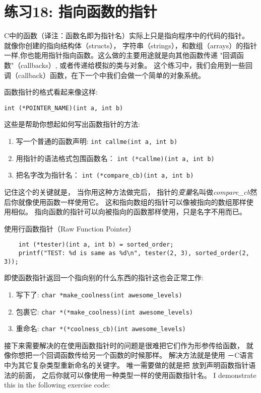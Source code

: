 \chapter{练习18: 指向函数的指针}

C中的函数（译注：函数名即为指针名）实际上只是指向程序中的代码的指针。 就像你创建的指向结构体（structs）， 字符串（strings），和数组（arrays）的指针一样,你也能用指针指向函数。这么做的主要用途就是向其他函数传递
"回调函数"（callbacks）, 或者传递给模拟的类与对象。 这个练习中，我们会用到一些回调（callback）函数，在下一个中我们会做一个简单的对象系统。

函数指针的格式看起来像这样:

\verb|int (*POINTER_NAME)(int a, int b)|

这些是帮助你想起如何写出函数指针的方法:

\begin{enumerate}
\item 写一个普通的函数声明: \verb|int callme(int a, int b)|
\item 用指针的语法格式包围函数名： \verb|int (*callme)(int a, int b)|
\item 把名字改为指针名： \verb|int (*compare_cb)(int a, int b)|
\end{enumerate}

记住这个的关键就是， 当你用这种方法做完后， 指针的\emph{变量}名叫做\emph{compare\_cb}然后你就像使用函数一样使用它。  这和指向数组的指针可以像被指向的数组那样使用相似。 指向函数的指针可以向被指向的函数那样使用，只是名字不用而已。

\begin{code}{使用行函数指针（Raw Function Pointer）}
\begin{lstlisting}
    int (*tester)(int a, int b) = sorted_order;
    printf("TEST: %d is same as %d\n", tester(2, 3), sorted_order(2, 3)); 
\end{lstlisting}
\end{code}

即使函数指针返回一个指向别的什么东西的指针这也会正常工作:

\begin{enumerate}
\item 写下了: \verb|char *make_coolness(int awesome_levels)|
\item 包裹它: \verb|char *(*make_coolness)(int awesome_levels)|
\item 重命名: \verb|char *(*coolness_cb)(int awesome_levels)|
\end{enumerate}

接下来需要解决的在使用函数指针时的问题是很难把它们作为形参传给函数， 就像你想把一个回调函数传给另一个函数的时候那样。 解决方法就是使用 －C语言中为其它复杂类型重新命名的关键字。
唯一需要做的就是把  放到声明函数指针语法的前面， 之后你就可以像使用一种类型一样的使用函数指针名。  I demonstrate this in the following exercise code:

